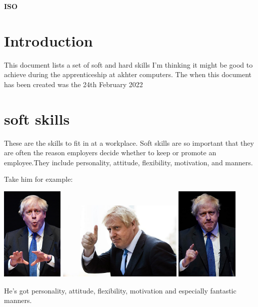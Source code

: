 \documentclass[a4paper,12pt]{article}
\begin{document}
\textbf{ISO}


\tableofcontents
\clearpage

 
\section{Introduction}
This document lists a set of soft and hard skills I'm thinking it might be good to achieve during the apprenticeship at akhter computers. The when this document has been created was the 24th February 2022

\section{soft skills}
These are the skills to fit in at a workplace. Soft skills are so important that they are often the reason employers decide whether to keep or promote an employee.They include personality, attitude, flexibility, motivation, and manners.

Take him for example:

\includegraphics[width=3cm]{./boris-soft.jpg}
\includegraphics[width=6cm]{./boris-soft3.jpg}
\includegraphics[width=3cm]{./boris-soft2.jpg}

He's got personality, attitude, flexibility, motivation and especially fantastic manners.
\end{document}
